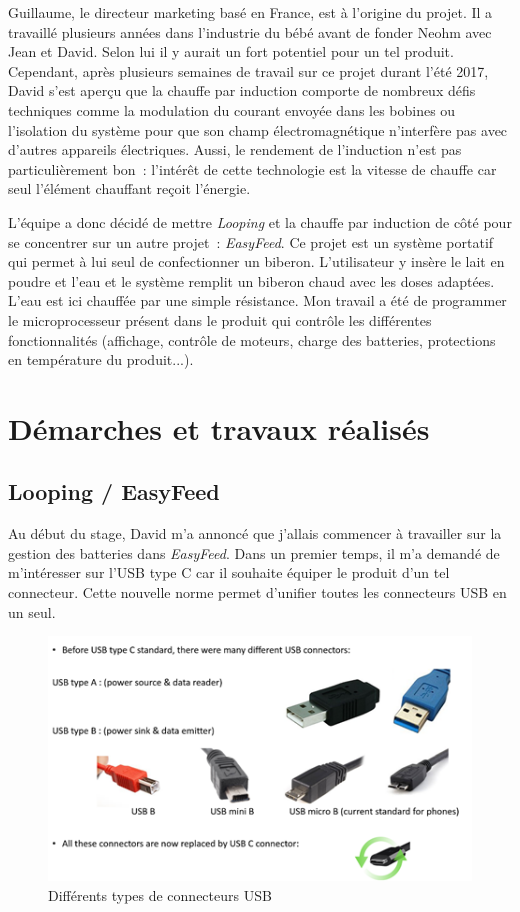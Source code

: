 \documentclass[a4paper, 12pt, sffamily]{report}
\begin{document}
Guillaume, le directeur marketing basé en France, est à l’origine du projet. Il a travaillé plusieurs années dans l’industrie du bébé avant de fonder Neohm avec Jean et David. Selon lui il y aurait un fort potentiel pour un tel produit.
Cependant, après plusieurs semaines de travail sur ce projet durant l’été 2017, David s’est aperçu que la chauffe par induction comporte de nombreux défis techniques comme la modulation du courant envoyée dans les bobines ou l’isolation du système pour que son champ électromagnétique n’interfère pas avec d’autres appareils électriques. Aussi, le rendement de l’induction n’est pas particulièrement bon~: l’intérêt de cette technologie est la vitesse de chauffe car seul l’élément chauffant reçoit l’énergie.

L’équipe a donc décidé de mettre \emph{Looping} et la chauffe par induction de côté pour se concentrer sur un autre projet~: \emph{EasyFeed}. Ce projet est un système portatif qui permet à lui seul de confectionner un biberon. L’utilisateur y insère le lait en poudre et l’eau et le système remplit un biberon chaud avec les doses adaptées. L’eau est ici chauffée par une simple résistance.
Mon travail a été de programmer le microprocesseur présent dans le produit qui contrôle les différentes fonctionnalités (affichage, contrôle de moteurs, charge des batteries, protections en température du produit...).


\chapter{Démarches et travaux réalisés}
\section{Looping / EasyFeed}
Au début du stage, David m’a annoncé que j'allais commencer à travailler sur la gestion des batteries dans \emph{EasyFeed}. Dans un premier temps, il m'a demandé de m’intéresser sur l’USB type C car il souhaite équiper le produit d’un tel connecteur. Cette nouvelle norme permet d’unifier toutes les connecteurs USB en un seul.

\begin{figure}[H]
\centering
\includegraphics[scale=0.75]{figures/screenshots/different_usb_types.png}
\caption{Différents types de connecteurs USB}
\label{fig:usb_type}
\end{figure}
\end{document}
